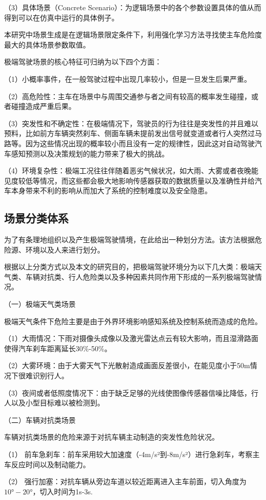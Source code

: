 （3）具体场景（Concrete Scenario）：为逻辑场景中的各个参数设置具体的值从而得到可以在仿真中运行的具体例子。

本研究中场景生成是在逻辑场景限定条件下，利用强化学习方法寻找使主车危险度最大的具体场景参数取值。

极端驾驶场景的核心特征可归纳为以下四个方面：

（1）小概率事件，在一般驾驶过程中出现几率较小，但是一旦发生后果严重。

（2）高危险性：主车在场景中与周围交通参与者之间有较高的概率发生碰撞，或者碰撞造成严重后果。

（3）突发性和不确定性：在极端情况下，驾驶员的行为往往是突发性的并且难以预料，比如前方车辆突然刹车、侧面车辆未提前发出信号就变道或者行人突然过马路等。因为这些情况出现的概率较小而且没有一定的规律性，因此这对自动驾驶汽车感知预测以及决策规划的能力带来了极大的挑战。

（4）环境复杂性：极端工况往往伴随着恶劣气候状况，如大雨、大雾或者夜晚能见度较低等情况，而这些都会极大地影响传感器获取的数据质量以及准确性并给汽车本身带来不利的影响从而加大了系统的控制难度以及安全隐患。
\subsection{场景分类体系}
为了有条理地组织以及产生极端驾驶情境，在此给出一种划分方法。该方法根据危险源、环境以及人来进行划分。

根据以上分类方式以及本文的研究目的，把极端驾驶环境分为以下几大类：极端天气类、车辆对抗类、行人危险类以及多种因素共同作用下形成的一系列极端驾驶情况\cite{zhan2025deep}。

（一）极端天气类场景

极端天气条件下危险主要是由于外界环境影响感知系统及控制系统而造成的危险。

（1）大雨情况：下雨对摄像头成像以及激光雷达点云有较大影响，而且湿滑路面使得汽车刹车距离延长30\%-50\%。

（2）大雾环境：由于大雾天气下光散射造成画面反差很小，在能见度小于50m情况下很难识别行人。

（3）夜间或者低照度情况下：由于缺乏足够的光线使图像传感器信噪比降低，行人以及小型目标难以被检测到。

（二）车辆对抗类场景

车辆对抗类场景的危险来源于对抗车辆主动制造的突发性危险状况\cite{zhou2025vehicle}。

（1） 前车急刹车：前车采用较大加速度（-4m/s²到-8m/s²）进行急刹车，考察主车反应时间以及制动能力。

（2） 强行加塞：对抗车辆从旁边车道以较近距离进入主车前面，切入角度为$10°-20°$，切入时间为1s-3s.

